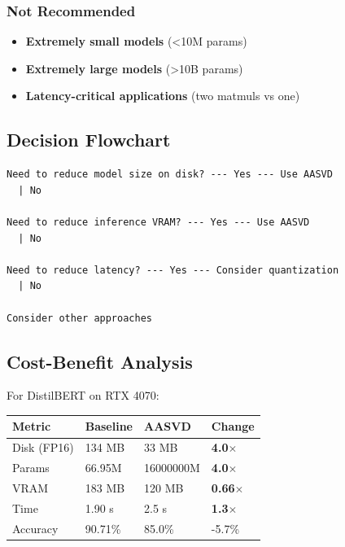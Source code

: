 \subsubsection{Not Recommended}

\begin{itemize}
\item \textbf{Extremely small models} (\textless{}10M params)
\item \textbf{Extremely large models} (\textgreater{}10B params)
\item \textbf{Latency-critical applications} (two matmuls vs one)

\end{itemize}
\subsection{Decision Flowchart}

\begin{lstlisting}
Need to reduce model size on disk? --- Yes --- Use AASVD
  | No
   
Need to reduce inference VRAM? --- Yes --- Use AASVD
  | No
   
Need to reduce latency? --- Yes --- Consider quantization
  | No
   
Consider other approaches
\end{lstlisting}

\subsection{Cost-Benefit Analysis}

For DistilBERT on RTX 4070:

\begin{table}[H]
\centering
\small
\begin{tabular}{llll}
\toprule
\textbf{Metric} & \textbf{Baseline} & \textbf{AASVD} & \textbf{Change} \\
\midrule
Disk (FP16) & 134 MB & 33 MB & \textbf{4.0$\times$} \\
Params & 66.95M & 16000000M & \textbf{4.0$\times$} \\
VRAM & 183 MB & 120 MB & \textbf{0.66$\times$} \\
Time & 1.90 s & 2.5 s & \textbf{1.3$\times$} \\
Accuracy & 90.71\% & 85.0\% & -5.7\% \\
\bottomrule
\end{tabular}
\end{table}

